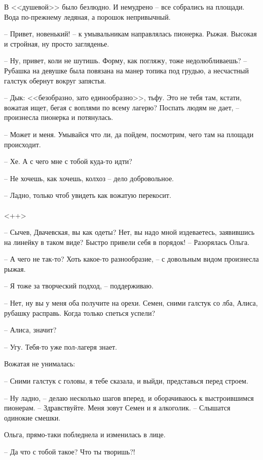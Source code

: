 \documentclass[a4paper]{book}
\begin{document}
В <<душевой>> было безлюдно. И немудрено -- все собрались на площади. Вода по-прежнему ледяная, а порошок непривычный. 

-- Привет, новенький! -- к умывальникам направлялась пионерка. Рыжая. Высокая и стройная, ну просто загляденье.

-- Ну, привет, коли не шутишь. Форму, как погляжу, тоже недолюбливаешь? -- Рубашка на девушке была повязана на манер топика под грудью, а несчастный галстук обернут вокруг запястья.

-- Дык: <<безобразно, зато единообразно>>, тьфу. Это не тебя там, кстати, вожатая ищет, бегая с воплями по всему лагерю? Поспать людям не дает, -- произнесла пионерка  и потянулась. 

-- Может и меня. Умывайся что ли, да пойдем, посмотрим, чего там на площади происходит. 

-- Хе. А с чего мне с тобой куда-то идти?

-- Не хочешь, как хочешь, колхоз -- дело добровольное.

-- Ладно, только чтоб увидеть как вожатую перекосит.

\paragraph{}<++>

-- Сычев, Двачевская, вы как одеты? Нет, вы надо мной издеваетесь, заявившись на линейку в таком виде? Быстро привели себя в порядок! -- Разорялась Ольга.

-- А чего не так-то? Хоть какое-то разнообразие, -- с довольным видом произнесла рыжая.

-- Я тоже за творческий подход, -- поддерживаю.

-- Нет, ну вы у меня оба получите на орехи. Семен, сними галстук со лба, Алиса, рубашку расправь. Когда только спеться успели?

-- Алиса, значит?

-- Угу. Тебя-то уже пол-лагеря знает.

Вожатая не унималась:

-- Сними галстук с головы, я тебе сказала, и выйди, представься перед строем.

-- Ну ладно, -- делаю несколько шагов вперед, и оборачиваюсь к выстроившимся пионерам. -- Здравствуйте. Меня зовут Семен и я алкоголик. -- Слышатся одинокие смешки.

Ольга, прямо-таки побледнела и изменилась в лице. 

-- Да что с тобой такое? Что ты творишь?!
\end{document}
